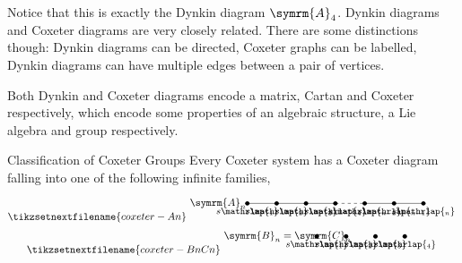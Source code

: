 \documentclass[fleqn]{NotesClass}
\newcommand{\dynkin}[2]{\symrm{#1}_{#2}}
\begin{document}
    \begin{remark}{}{}
        Notice that this is exactly the Dynkin diagram \(\dynkin{A}{4}\).
        Dynkin diagrams and Coxeter diagrams are very closely related.
        There are some distinctions though: Dynkin diagrams can be directed, Coxeter graphs can be labelled, Dynkin diagrams can have multiple edges between a pair of vertices.
        
        Both Dynkin and Coxeter diagrams encode a matrix, Cartan and Coxeter respectively, which encode some properties of an algebraic structure, a Lie algebra and group respectively.
    \end{remark}
    
    \begin{thm}{Classification of Coxeter Groups}{}
        Every Coxeter system has a Coxeter diagram falling into one of the following infinite families,
        \begin{gather}
            \tikzsetnextfilename{coxeter-An}
            \begin{tikzpicture}[font=\small]
                \node at (-1, 0) {\normalsize\(\dynkin{A}{n}\)};
                \fill (0, 0) circle [radius=0.075cm] node [below] {\(s\mathrlap{_1}\)};
                \fill (1, 0) circle [radius=0.075cm] node [below] {\(s\mathrlap{_2}\)};
                \fill (2, 0) circle [radius=0.075cm] node [below] {\(s\mathrlap{_3}\)};
                \fill (3, 0) circle [radius=0.075cm] node [below] {\(s\mathrlap{_4}\)};
                \draw (0, 0) -- (3, 0);
                \draw [dashed] (3, 0) -- ++ (1, 0);
                \fill (4, 0) circle [radius=0.075cm] node [below] {\(s\mathrlap{_{n-2}}\)};
                \fill (5, 0) circle [radius=0.075cm] node [below] {\(s\mathrlap{_{n-1}}\)};
                \fill (6, 0) circle [radius=0.075cm] node [below] {\(s\mathrlap{_n}\)};
                \draw (4, 0) -- (6, 0);
            \end{tikzpicture}
            \\
            \tikzsetnextfilename{coxeter-BnCn}
            \begin{tikzpicture}[font=\small]
                \node at (-1, 0) {\normalsize\(\dynkin{B}{n} = \dynkin{C}{n}\)};
                \fill (0, 0) circle [radius=0.075cm] node [below] {\(s\mathrlap{_1}\)};
                \fill (1, 0) circle [radius=0.075cm] node [below] {\(s\mathrlap{_2}\)};
                \fill (2, 0) circle [radius=0.075cm] node [below] {\(s\mathrlap{_3}\)};
                \fill (3, 0) circle [radius=0.075cm] node [below] {\(s\mathrlap{_4}\)};

\end{tikzpicture}
\end{gather}
\end{thm}
\end{document}
